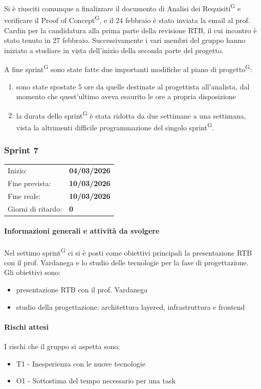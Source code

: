 \documentclass[a4paper, 11pt]{article}
\newcommand{\subsubsubsection}[1]{\paragraph{#1}}
\begin{document}
Si è riusciti comunque a finalizzare il documento di Analisi dei Requisiti\textsuperscript{G} e verificare il Proof of Concept\textsuperscript{G}, e il 24 febbraio è stato inviata la email al prof. Cardin per la candidatura alla prima parte della revisione RTB, il cui incontro è stato tenuto in 27 febbraio. Successivamente i vari membri del gruppo hanno iniziato a studiare in vista dell'inizio della seconda parte del progetto.

A fine sprint\textsuperscript{G} sono state fatte due importanti modifiche al piano di progetto\textsuperscript{G}:
\begin{enumerate}
	\item sono state spostate 5 ore da quelle destinate al progettista all'analista, dal momento che quest'ultimo aveva esaurito le ore a propria disposizione
	\item la durata dello sprint\textsuperscript{G} è stata ridotta da due settimane a una settimana, vista la altrimenti difficile programmazione del singolo sprint\textsuperscript{G}.
\end{enumerate}


\newpage

\subsubsection{Sprint 7}
\begin{tabular}{ll}
	Inizio: & \textbf{04/03/2026} \\
	Fine prevista: & \textbf{10/03/2026} \\
	Fine reale: & \textbf{10/03/2026} \\
	Giorni di ritardo: & \textbf{0} \\
\end{tabular}

\subsubsubsection{Informazioni generali e attività da svolgere}
Nel settimo sprint\textsuperscript{G} ci si è posti come obiettivi principali la presentazione RTB con il prof. Vardanega e lo studio delle tecnologie per la fase di progettazione.\\
Gli obiettivi sono:
\begin{itemize}
	\item presentazione RTB con il prof. Vardanega
	\item studio della progettazione: architettura layered, infrastruttura e frontend
\end{itemize}

\subsubsubsection{Rischi attesi}
I rischi che il gruppo si aspetta sono:
\begin{itemize}
	\item T1 - Inesperienza con le nuove tecnologie
	\item O1 - Sottostima del tempo necessario per una task
\end{itemize}
\end{document}
